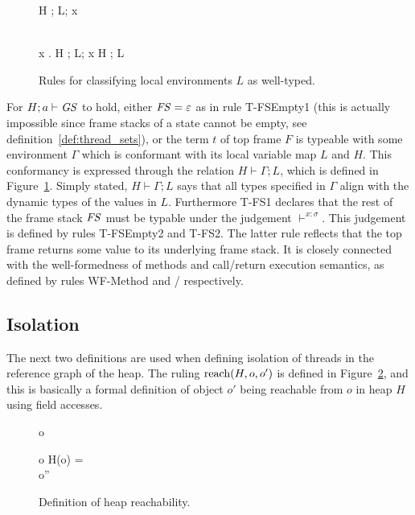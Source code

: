 \begin{figure}
  {}
  { H \vdash \Gamma; L; x }

  \RuleSpace{}

  {\dom{(\Gamma)} \subseteq {} \\
    \forall x \in \dom{(\Gamma)}. \: H \vdash \Gamma; L; x 
  }
  { H \vdash \Gamma; L }

  \caption{Rules for classifying local environments $L$ as well-typed.}
  \label{fig:local_typing}
\end{figure}

For $H; a \vdash \mathit{GS}$ to hold, either $\mathit{FS} = \varepsilon$ as in rule {\sc
T-FSEmpty1} (this is actually impossible since frame stacks of a state cannot be
empty, see definition~\ref{def:thread_sets}), or the term $t$ of top frame $F$
is typeable with some environment $\Gamma$ which is conformant with its local
variable map $L$ and $H$. This conformancy is expressed through the relation $H
\vdash \Gamma; L$, which is defined in Figure~\ref{fig:local_typing}. Simply
stated, $H \vdash \Gamma;L$ says that all types specified in $\Gamma$ align
with the dynamic types of the values in $L$. Furthermore {\sc T-FS1} declares
that the rest of the frame stack $\mathit{FS}$ must be typable under the judgement
$\vdash^{x: \sigma}$. This judgement is defined by rules {\sc T-FSEmpty2} and
{\sc T-FS2}. The latter rule reflects that the top frame returns some value to its
underlying frame stack. It is closely connected with the well-formedness of
methods and call\slash return execution semantics, as defined by rules {\sc
WF-Method} and \ECall{}\slash\ERet{} respectively.

\subsection{Isolation}%
\label{sub:isolation}

The next two definitions are used when defining isolation of threads in the
reference graph of the heap. The ruling $\mbox{$\mathrm{reach}$}(H, o, o')$ is defined in
Figure~\ref{fig:def_reach}, and this is basically a formal definition of object
$o'$ being reachable from $o$ in heap $H$ using field accesses.

\begin{figure}
  {o \in {}}
  {}

  \RuleSpace{}

  {
    o \in {} \andalso H(o) =  \\
    o'' \in \codom{(\FM)} \andalso {}
  }
  {  }
  \caption{Definition of heap reachability.}
  \label{fig:def_reach}
\end{figure}

